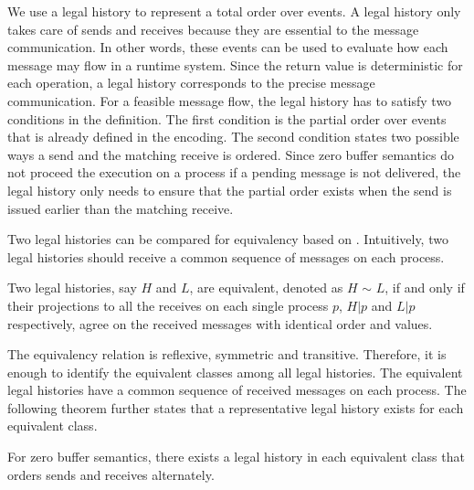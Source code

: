 We use a legal history to represent a total order over events. A legal history only takes care of sends and receives because they are essential to the message communication. In other words, these events can be used to evaluate how each message may flow in a runtime system. Since the return value is deterministic for each operation, a legal history corresponds to the precise message communication. For a feasible message flow, the legal history has to satisfy two conditions in the definition. The first condition is the partial order over events that is already defined in the encoding. The second condition states two possible ways a send and the matching receive is ordered. Since zero buffer semantics do not proceed the execution on a process if a pending message is not delivered, the legal history only needs to ensure that the partial order exists when the send is issued earlier than the matching receive. 


Two legal histories can be compared for equivalency based on . Intuitively, two legal histories should receive a common sequence of messages on each process. 

\begin{definition}\label{def:er}
Two legal histories, say $H$ and $L$, are equivalent, denoted as $H$ $\sim$ $L$, if and only if their projections to all the receives on each single process $p$, $H | p$ and $L | p$ respectively, agree on the received messages with identical order and values.
\end{definition}

The equivalency relation is reflexive, symmetric and transitive. Therefore, it is enough to identify the equivalent classes among all legal histories. The equivalent legal histories have a common sequence of received messages on each process. The following theorem further states that a representative legal history exists for each equivalent class. 

\begin{theorem}
For zero buffer semantics, there exists a legal history in each equivalent class that orders sends and receives alternately.
\end{theorem}

